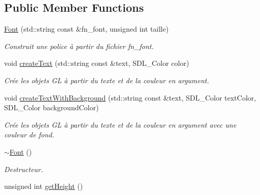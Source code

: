 \subsection*{Public Member Functions}
\begin{DoxyCompactItemize}
\item 
\hypertarget{classFont_a7ec05e69ec8490a65bb9905d44d57012}{\hyperlink{classFont_a7ec05e69ec8490a65bb9905d44d57012}{Font} (std\+::string const \&fn\+\_\+font, unsigned int taille)}\label{classFont_a7ec05e69ec8490a65bb9905d44d57012}

\begin{DoxyCompactList}\small\item\em Construit une police à partir du fichier fn\+\_\+font. \end{DoxyCompactList}\item 
\hypertarget{classFont_a28cfa9fa2ad26801f300007ad7ef52a0}{void \hyperlink{classFont_a28cfa9fa2ad26801f300007ad7ef52a0}{create\+Text} (std\+::string const \&text, S\+D\+L\+\_\+\+Color color)}\label{classFont_a28cfa9fa2ad26801f300007ad7ef52a0}

\begin{DoxyCompactList}\small\item\em Crée les objets G\+L à partir du texte et de la couleur en argument. \end{DoxyCompactList}\item 
\hypertarget{classFont_a0eb98cf6abe4b13b39d677913da7d209}{void \hyperlink{classFont_a0eb98cf6abe4b13b39d677913da7d209}{create\+Text\+With\+Background} (std\+::string const \&text, S\+D\+L\+\_\+\+Color text\+Color, S\+D\+L\+\_\+\+Color background\+Color)}\label{classFont_a0eb98cf6abe4b13b39d677913da7d209}

\begin{DoxyCompactList}\small\item\em Crée les objets G\+L à partir du texte et de la couleur en argument avec une couleur de fond. \end{DoxyCompactList}\item 
\hypertarget{classFont_a134aaa2f78af0c12d3ce504957169768}{\hyperlink{classFont_a134aaa2f78af0c12d3ce504957169768}{$\sim$\+Font} ()}\label{classFont_a134aaa2f78af0c12d3ce504957169768}

\begin{DoxyCompactList}\small\item\em Destructeur. \end{DoxyCompactList}\item 
\hypertarget{classFont_a50481f4b9b551b4b4fcf45e9dee43658}{unsigned int \hyperlink{classFont_a50481f4b9b551b4b4fcf45e9dee43658}{get\+Height} ()}\label{classFont_a50481f4b9b551b4b4fcf45e9dee43658}


\end{DoxyCompactItemize}
